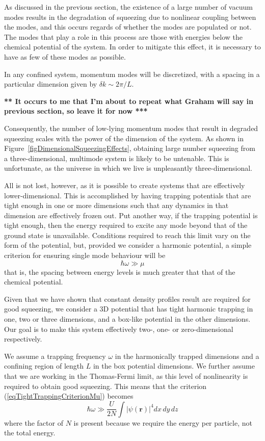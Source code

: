 \documentclass{iopart}
\begin{document}
As discussed in the previous section, the existence of a large number of vacuum modes results in the degradation of squeezing due to nonlinear coupling between the modes, and this occurs regards of whether the modes are populated or not. The modes that play a role in this process are those with energies below the chemical potential of the system. In order to mitigate this effect, it is necessary to have as few of these modes as possible.

In any confined system, momentum modes will be discretized, with a spacing in a particular dimension given by $\delta k \sim 2\pi/L$.

{\bf *** It occurs to me that I'm about to repeat what Graham will say in previous section, so leave it for now ***}

Consequently, the number of low-lying momentum modes that result in degraded squeezing scales with the power of the dimension of the system. As shown in Figure~\ref{figDimensionalSqueezingEffects}, obtaining large number squeezing from a three-dimensional, multimode system is likely to be untenable. This is unfortunate, as the universe in which we live is unpleasantly three-dimensional.

All is not lost, however, as it is possible to create systems that are effectively lower-dimensional. This is accomplished by having trapping potentials that are tight enough in one or more dimensions such that any dynamics in that dimension are effectively frozen out. Put another way, if the trapping potential is tight enough, then the energy required to excite any mode beyond that of the ground state is unavailable. Conditions required to reach this limit vary on the form of the potential, but, provided we consider a harmonic potential, a simple criterion for ensuring single mode behaviour will be 
\begin{equation}
\hbar \omega \gg \mu
\label{eqTightTrappingCriterionMu}
\end{equation}
that is, the spacing between energy levels is much greater that that of the chemical potential.

Given that we have shown that constant density profiles result are required for good squeezing, we consider a 3D potential that has tight harmonic trapping in one, two or three dimensions, and a box-like potential in the other dimensions. Our goal is to make this system effectively two-, one- or zero-dimensional respectively.

We assume a trapping frequency $\omega$ in the harmonically trapped dimensions and a confining region of length $L$ in the box potential dimensions. We further assume that we are working in the Thomas-Fermi limit, as this level of nonlinearity is required to obtain good squeezing. This means that the criterion (\ref{eqTightTrappingCriterionMu}) becomes
\begin{equation}
\hbar \omega \gg \frac{U}{2N} \int |\psi({\mathbf{r}})|^4 dx \, dy \, dz
\label{eqTightTrappingCriterionU}
\end{equation}
where the factor of $N$ is present because we require the energy per particle, not the total energy.
\end{document}
